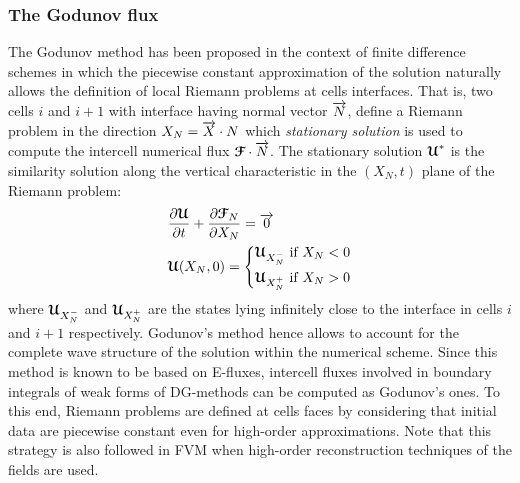 \subsubsection*{The Godunov flux}
The Godunov method \cite{Godunov_method} has been proposed in the context of finite difference schemes in which the piecewise constant approximation of the solution naturally allows the definition of local Riemann problems at cells interfaces. That is, two cells $i$ and $i+1$ with interface having normal vector ${\overrightarrow{N}}$, define a Riemann problem in the direction $X_N={\overrightarrow{X}}\cdot{N}$ which \textit{stationary solution} is used to compute the intercell numerical flux ${\boldsymbol{\mathcal{F}}} \cdot {\overrightarrow{N}}$. The stationary solution ${\boldsymbol{\mathcal{U}}}^*$ is the similarity solution along the vertical characteristic in the $(X_N,t)$ plane of the Riemann problem:
\begin{equation}
  \label{eq:RP_mesh}
  \begin{aligned}
    &\frac{\partial {\boldsymbol{\mathcal{U}}}}{\partial t} + \frac{\partial {\boldsymbol{\mathcal{F}}}_N}{\partial X_N} = {\overrightarrow{0}}  \\
    & {\boldsymbol{\mathcal{U}}}(X_N,0)= \left\lbrace 
      \begin{aligned}
        & {\boldsymbol{\mathcal{U}}}_{X_N^-} \text{ if } X_N <0 \\
        & {\boldsymbol{\mathcal{U}}}_{X_N^{+}} \text{ if } X_N > 0
      \end{aligned}
        \right.
  \end{aligned}
\end{equation}
where ${\boldsymbol{\mathcal{U}}}_{X_N^-}$ and ${\boldsymbol{\mathcal{U}}}_{X_N^{+}}$ are the states lying infinitely close to the interface in cells $i$ and $i+1$ respectively. 
Godunov's method hence allows to account for the complete wave structure of the solution within the numerical scheme. Since this method is known to be based on E-fluxes, intercell fluxes involved in boundary integrals of weak forms of DG-methods can be computed as Godunov's ones. To this end, Riemann problems are defined at cells faces by considering that initial data are piecewise constant even for high-order approximations. Note that this strategy is also followed in FVM when high-order reconstruction techniques of the fields are used.

